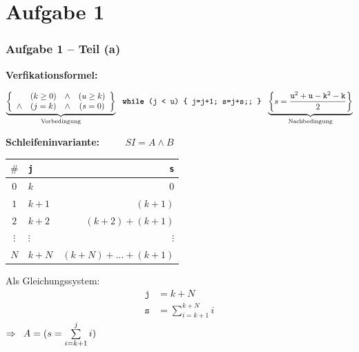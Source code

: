 \documentclass{beamer}
\renewcommand{\emph}[1]{\textbf{#1}}
\begin{document}
\section{Aufgabe 1}

\begin{frame} \frametitle{Aufgabe 1 -- Teil (a)}
	\footnotesize
	\textbf{Verfikationsformel:}
	\begin{scriptsize}
		\setlength\arraycolsep{1pt}
		\begin{equation*}
			\underbrace{ \left\{ \begin{array}{cccc}
					      & (k \ge 0) &\land& (u \ge k) \\
					\land & (j = k)   &\land& (s = 0)
				\end{array}
			\right\}}_{\text{Vorbedingung}} \ \ \texttt{\emph{while} (\texttt{j} < \texttt{u}) \{ \texttt{j=j+1; s=j+s;}; \}} \ \ \underbrace{ \left\{
				s = \frac{\texttt{u}^2 + \texttt{u} - \texttt{k}^2 - \texttt{k}}{2}
			\right\}}_{\text{Nachbedingung}}
		\end{equation*}
	\end{scriptsize}
	
	
	\pause
	
	\textbf{Schleifeninvariante:} $\qquad$ $SI = A \land B$ \pause
	
	\begin{minipage}{\dimexpr0.6\linewidth-\fboxrule-\fboxsep}
		\begin{center}
			\begin{tabular}{|c||l|r|}
				\hline
				$\#$ & \texttt{j} & \texttt{s} \\
				\hline\hline
				$0$	 & $k$   & $0$  \\
				$1$  & $k+1$ & $(k+1)$  \\
				$2$  & $k+2$ & $(k+2) + (k+1)$ \\
				$\vdots$ & $\vdots$ & $\vdots$ \\
				$N$  & $k+N$ & $(k+N) + \dots + (k+1)$ \\
				\hline
			\end{tabular}
		\end{center}
	\end{minipage}
	\begin{minipage}{\dimexpr0.4\linewidth-\fboxrule-\fboxsep}
		\centering
		Als Gleichungssystem:
		\begin{equation*}
			\begin{array}{rl}
			\texttt{j} &= k + N \\ \texttt{s} &= \sum\limits_{i = k+1}^{k+N} i
			\end{array}
		\end{equation*}
		$\Rightarrow \enskip A = (s = \sum\limits_{i = k+1}^j i)$		
	\end{minipage}
\end{frame}
\end{document}
